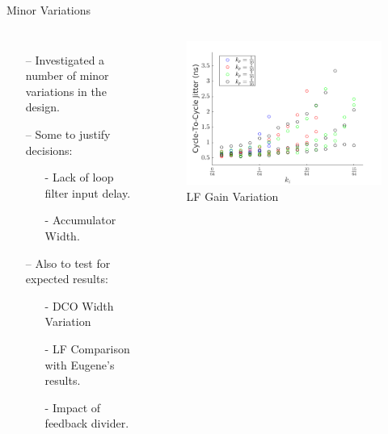 \documentclass{beamer}
\begin{document}
\begin{frame}{Minor Variations}
\vspace{-0.6 cm}
	\begin{columns}
		\begin{itemize}
			\item[--]
			Investigated a number of minor variations in the design.
			\item[--]
			Some to justify decisions:%
			\begin{itemize}
				\item[-]
					Lack of loop filter input delay.
				\item[-]
					Accumulator Width.
			\end{itemize}  
			\item[--]
			Also to test for expected results:
			\begin{itemize}
				\item[-]
					DCO Width Variation
				\item[-]
					LF Comparison with Eugene's results.
				\item[-]
					Impact of feedback divider.
			\end{itemize}
		\end{itemize}
		\begin{figure}
			\includegraphics[width=\linewidth]{../fixed_kp_zoom}
			\vspace{-0.8 cm}
			\caption{LF Gain Variation}
		\end{figure}

\end{columns}
\end{frame}
\end{document}
